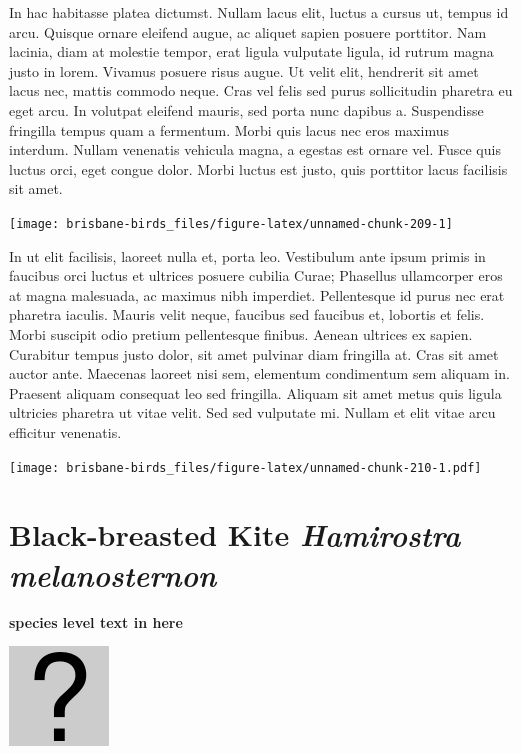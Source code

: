 \documentclass[]{book}
\let\origfigure\figure
\let\endorigfigure\endfigure
\renewenvironment{figure}[1][2] {
  \expandafter\origfigure\expandafter[H]
} {
  \endorigfigure
}
\begin{document}
In hac habitasse platea dictumst. Nullam lacus elit, luctus a cursus ut,
tempus id arcu. Quisque ornare eleifend augue, ac aliquet sapien posuere
porttitor. Nam lacinia, diam at molestie tempor, erat ligula vulputate
ligula, id rutrum magna justo in lorem. Vivamus posuere risus augue. Ut
velit elit, hendrerit sit amet lacus nec, mattis commodo neque. Cras vel
felis sed purus sollicitudin pharetra eu eget arcu. In volutpat eleifend
mauris, sed porta nunc dapibus a. Suspendisse fringilla tempus quam a
fermentum. Morbi quis lacus nec eros maximus interdum. Nullam venenatis
vehicula magna, a egestas est ornare vel. Fusce quis luctus orci, eget
congue dolor. Morbi luctus est justo, quis porttitor lacus facilisis sit
amet.

\begin{figure}
\texttt{[image: brisbane-birds\_files/figure-latex/unnamed-chunk-209-1]} \caption{insert figure caption}\label{fig:unnamed-chunk-209}
\end{figure}

In ut elit facilisis, laoreet nulla et, porta leo. Vestibulum ante ipsum
primis in faucibus orci luctus et ultrices posuere cubilia Curae;
Phasellus ullamcorper eros at magna malesuada, ac maximus nibh
imperdiet. Pellentesque id purus nec erat pharetra iaculis. Mauris velit
neque, faucibus sed faucibus et, lobortis et felis. Morbi suscipit odio
pretium pellentesque finibus. Aenean ultrices ex sapien. Curabitur
tempus justo dolor, sit amet pulvinar diam fringilla at. Cras sit amet
auctor ante. Maecenas laoreet nisi sem, elementum condimentum sem
aliquam in. Praesent aliquam consequat leo sed fringilla. Aliquam sit
amet metus quis ligula ultricies pharetra ut vitae velit. Sed sed
vulputate mi. Nullam et elit vitae arcu efficitur venenatis.

\begin{figure}
\centering
\texttt{[image: brisbane-birds\_files/figure-latex/unnamed-chunk-210-1.pdf]}
\caption{\label{fig:unnamed-chunk-210}insert figure caption}
\end{figure}

\section{\texorpdfstring{Black-breasted Kite \emph{Hamirostra
melanosternon}}{Black-breasted Kite Hamirostra melanosternon}}\label{black-breasted-kite-hamirostra-melanosternon}

\textbf{species level text in here}

\begin{figure}
\centering
\includegraphics{assets/missing.png}
\caption{No image for species}
\end{figure}
\end{document}
